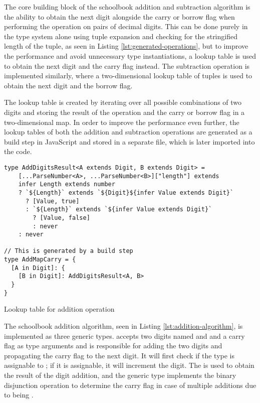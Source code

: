 The core building block of the schoolbook addition and subtraction algorithm is the ability to obtain the next digit alongside the carry or borrow flag when performing the operation on pairs of decimal digits. This can be done purely in the type system alone using tuple expansion and checking for the stringified length of the tuple, as seen in Listing \ref{lst:generated-operations}, but to improve the performance and avoid unnecessary type instantiations, a lookup table is used to obtain the next digit and the carry flag instead. The subtraction operation is implemented similarly, where a two-dimensional lookup table of tuples is used to obtain the next digit and the borrow flag.

The lookup table is created by iterating over all possible combinations of two digits and storing the result of the operation and the carry or borrow flag in a two-dimensional map. In order to improve the performance even further, the lookup tables of both the addition and subtraction operations are generated as a build step in JavaScript and stored in a separate file, which is later imported into the code.

\begin{listing}[ht]
  \begin{verbatim}
type AddDigitsResult<A extends Digit, B extends Digit> =
    [...ParseNumber<A>, ...ParseNumber<B>]["length"] extends 
    infer Length extends number
    ? `${Length}` extends `${Digit}${infer Value extends Digit}`
      ? [Value, true]
      : `${Length}` extends `${infer Value extends Digit}`
        ? [Value, false]
        : never
    : never

// This is generated by a build step
type AddMapCarry = {
  [A in Digit]: {
    [B in Digit]: AddDigitsResult<A, B>
  }
}
\end{verbatim}
  \caption{Lookup table for addition operation}\label{lst:generated-operations}
\end{listing}

The schoolbook addition algorithm, seen in Listing \ref{lst:addition-algorithm}, is implemented as three generic types.  accepts two digits named  and  and a carry flag as type arguments and is responsible for adding the two digits and propagating the carry flag to the next digit. It will first check if the  type is assignable to ; if it is assignable, it will increment the  digit. The  is used to obtain the result of the digit addition, and the  generic type implements the binary disjunction operation to determine the carry flag in case of multiple additions due to  being .

